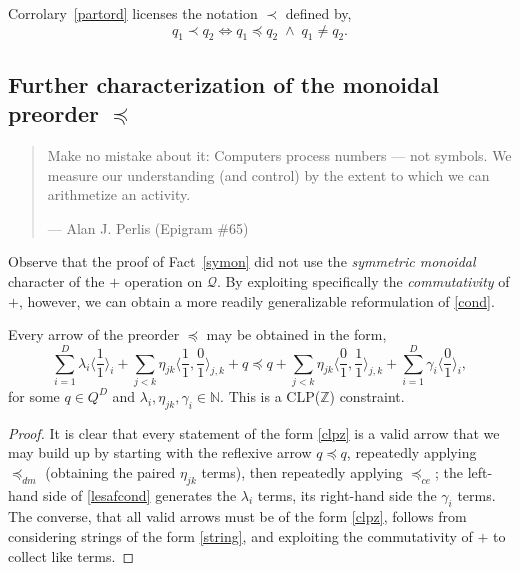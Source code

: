 \documentclass{article}
\newcommand{\N}{\mathbb{N}}
\newcommand{\Q}{\ensuremath{\mathcal{Q}}}
\begin{document}
\begin{nota}
  Corrolary~\ref{partord} licenses the notation $\prec$ defined by,
  $$
  q_1 \prec q_2 \iff q_1 \preceq q_2 \;\wedge\; q_1 \neq q_2.
  $$
\end{nota}

\subsection{Further characterization of the monoidal preorder $\preceq$}

\begin{quote}
  Make no mistake about it: Computers process numbers --- not symbols.
  We measure our understanding (and control) by the extent to which
  we can arithmetize an activity.
  
  \hfill --- Alan J. Perlis (Epigram \#65)
\end{quote}

Observe that the proof of Fact~\ref{symon} did not use the {\em symmetric monoidal} character of the $+$ operation on $\Q$.  By exploiting specifically the {\em commutativity} of $+$, however, we can obtain a more readily generalizable reformulation of \eqref{cond}.

\begin{fact}
  Every arrow of the preorder $\preceq$ may be obtained in the form,
  \begin{equation}
  \sum_{i=1}^D \lambda_i\langle\frac{1}{1}\rangle_i + \sum_{j<k} \eta_{jk}\langle\frac{1}{1},\frac{0}{1}\rangle_{j,k} +q \preceq q + \sum_{j<k} \eta_{jk}\langle\frac{0}{1},\frac{1}{1}\rangle_{j,k} + \sum_{i=1}^D \gamma_i\langle\frac{0}{1}\rangle_i, \label{clpz}
  \end{equation}
  for some $q \in Q^D$ and $\lambda_i, \eta_{jk}, \gamma_i \in \N$.  This is a CLP($\mathbb{Z}$) constraint.
\end{fact}
\begin{proof}
  It is clear that every statement of the form \eqref{clpz} is a valid arrow that we may build up by starting with the reflexive arrow $q \preceq q$, repeatedly applying $\preceq_{dm}$ (obtaining the paired $\eta_{jk}$ terms), then repeatedly applying $\preceq_{ce}$; the left-hand side of \eqref{lesafcond} generates the $\lambda_i$ terms, its right-hand side the $\gamma_i$ terms.
  The converse, that all valid arrows must be of the form \eqref{clpz}, follows from considering strings of the form \eqref{string}, and exploiting the commutativity of $+$ to collect like terms.
\end{proof}
\end{document}
